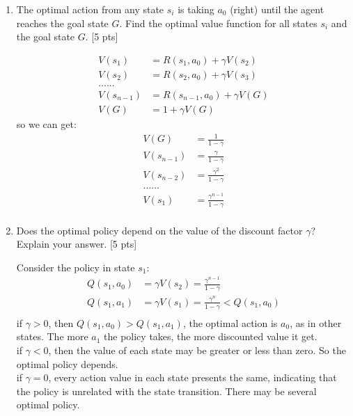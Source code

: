 \documentclass[11pt]{article}
\begin{document}
\begin{enumerate}[label=(\alph*)]
\item The optimal action from any state $s_i$ is taking $a_0$ (right) until the agent reaches the goal state $G$. Find the optimal value function for all states $s_i$ and the goal state $G$. [5 pts]

\begin{tcolorbox}[breakable]
  \begin{equation}
    \begin{aligned}
      V(s_1)&=R(s_1, a_0)+\gamma V(s_2)\\
      V(s_2)&=R(s_2, a_0)+\gamma V(s_3)\\
      ......\\
      V(s_{n-1})&=R(s_{n-1}, a_0)+\gamma V(G)\\
      V(G)&=1+\gamma V(G)
    \end{aligned}
  \end{equation}so we can get:
  \begin{equation}
    \begin{aligned}
      V(G)&=\frac{1}{1-\gamma}\\
      V(s_{n-1})&=\frac{\gamma}{1-\gamma}\\
      V(s_{n-2})&=\frac{\gamma^2}{1-\gamma}\\
      ......\\
      V(s_1)&=\frac{\gamma^{n-1}}{1-\gamma}\\
    \end{aligned}
  \end{equation}
\end{tcolorbox}

\item Does the optimal policy depend on the value of the discount factor $\gamma$? Explain your answer. [5 pts]

\begin{tcolorbox}[breakable]
  Consider the policy in state $s_1$:\\
  \begin{equation}
    \begin{aligned}
      Q(s_1, a_0)&=\gamma V(s_2)=\frac{\gamma^{n-1}}{1-\gamma}\\
      Q(s_1, a_1)&=\gamma V(s_1)=\frac{\gamma^n}{1-\gamma}<Q(s_1, a_0)\\
    \end{aligned}
  \end{equation}
  if $\gamma>0$, then $Q(s_1,a_0)>Q(s_1,a_1)$, the optimal action is $a_0$, as in other states. The more $a_1$ the policy takes, the more discounted value it get.\\
  if $\gamma<0$, then the value of each state may be greater or less than zero. So the optimal policy depends.\\
  if $\gamma=0$, every action value in each state presents the same, indicating that the policy is unrelated with the state transition. There may be several optimal policy.
\end{tcolorbox}


\end{enumerate}
\end{document}
